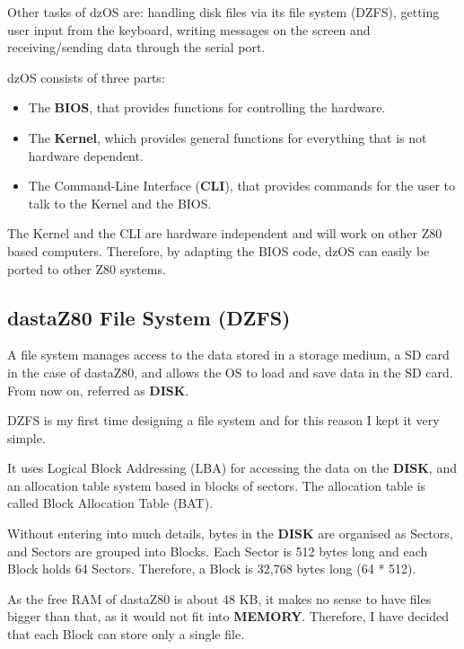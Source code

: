 \documentclass[a4paper,11pt]{article}
\begin{document}
    Other tasks of dzOS are: handling disk files via its file system (DZFS),
    getting user input from the keyboard, writing messages on the screen and
    receiving/sending data through the serial port.

    dzOS consists of three parts:
    \begin{itemize}
        \item The \textbf{BIOS}, that provides functions for controlling the
        hardware.
        \item The \textbf{Kernel}, which provides general functions for
        everything that is not hardware dependent.
        \item The Command-Line Interface (\textbf{CLI}), that provides commands
        for the user to talk to the Kernel and the BIOS.
    \end{itemize}

    The Kernel and the CLI are hardware independent and will work on other Z80
    based computers. Therefore, by adapting the BIOS code, dzOS can easily be
    ported to other Z80 systems.

    \subsection{dastaZ80 File System (DZFS)}
    A file system manages access to the data stored in a storage medium, a
    SD card in the case of dastaZ80, and allows the OS to load and save data in
    the SD card. From now on, referred as \textbf{DISK}.

    DZFS is my first time designing a file system and for this reason I kept it
    very simple.

    It uses Logical Block Addressing (LBA) for accessing the data on the
    \textbf{DISK}, and an allocation table system based in blocks of sectors.
    The allocation table is called Block Allocation Table (BAT).

    Without entering into much details, bytes in the \textbf{DISK} are organised
    as Sectors, and Sectors are grouped into Blocks. Each Sector is 512 bytes
    long and each Block holds 64 Sectors. Therefore, a Block is 32,768 bytes
    long (64 * 512).

    As the free RAM of dastaZ80 is about 48 KB, it makes no sense to have files
    bigger than that, as it would not fit into \textbf{MEMORY}. Therefore, I
    have decided that each Block can store only a single file.
\end{document}
